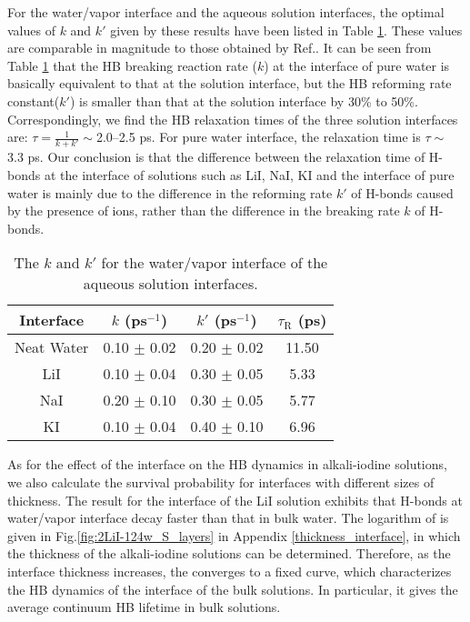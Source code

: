 For the water/vapor interface and the aqueous solution interfaces, 
the optimal values of $k$ and $k'$ given by these results have been listed in Table \ref{tab:k_k_prime_pure_and_solutions}. 
These values are comparable in magnitude to those obtained by Ref.. 
It can be seen from Table \ref{tab:k_k_prime_pure_and_solutions} that the HB breaking reaction rate ($k$) at the interface of pure water is basically equivalent to 
that at the solution interface, but the HB reforming rate constant($k'$) is smaller than that at the solution interface by 30\% to 50\%.
Correspondingly, we find the HB relaxation times of the three solution interfaces are: $\tau=\frac{1}{k+k'} \sim $2.0--2.5 ps. 
For pure water interface, the relaxation time is $\tau \sim $ 3.3 ps. 
Our conclusion is that the difference between the relaxation time of H-bonds at the interface of solutions such as LiI, NaI, KI 
and the interface of pure water is mainly due to the difference in the reforming rate $k'$ of H-bonds caused by the presence of ions,
rather than the difference in the breaking rate $k$ of H-bonds.
%
\begin{table}[htbp]
\centering
\caption{\label{tab:k_k_prime_pure_and_solutions} 
    The $k$ and $k'$ for the water/vapor interface of the aqueous solution interfaces.} 
\begin{tabular}{cccc}
 Interface & $k$ (ps$^{-1}$) & $k'$ (ps$^{-1}$) & $\tau_{\text{R}}$ (ps) \\
\hline
  Neat Water & 0.10 $\pm$ 0.02 & 0.20 $\pm$ 0.02 & 11.50 \\
  LiI & 0.10 $\pm$ 0.04 & 0.30 $\pm$ 0.05 & 5.33 \\
  NaI & 0.20 $\pm$ 0.10 & 0.30 $\pm$ 0.05 & 5.77 \\
  KI  & 0.10 $\pm$ 0.04 & 0.40 $\pm$ 0.10 & 6.96 
\end{tabular}
\end{table}
As for the effect of the interface on the HB dynamics in alkali-iodine solutions,
we also calculate the survival probability for interfaces with different sizes of thickness. 
The result for the interface of the LiI solution exhibits that H-bonds at water/vapor interface decay faster than that in bulk water.
The logarithm of \SHB is given in Fig.\space\ref{fig:2LiI-124w_S_layers} in Appendix \ref{thickness_interface}, 
in which the thickness of the alkali-iodine solutions can be determined.
Therefore, as the interface thickness increases, the \SHB converges to a fixed curve, 
which characterizes the HB dynamics of the interface of the bulk solutions. 
In particular, it gives the average continuum HB lifetime in bulk solutions.
